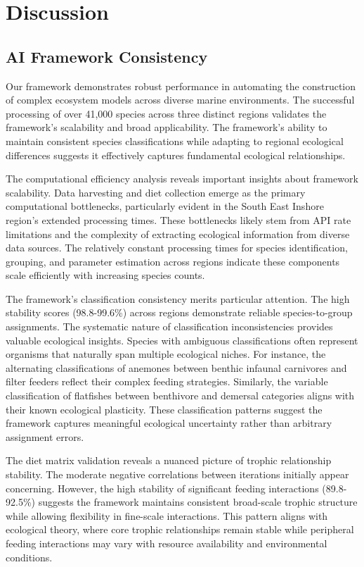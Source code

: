 \section{Discussion}

\subsection{AI Framework Consistency}
Our framework demonstrates robust performance in automating the construction of complex ecosystem models across diverse marine environments. The successful processing of over 41,000 species across three distinct regions validates the framework's scalability and broad applicability. The framework's ability to maintain consistent species classifications while adapting to regional ecological differences suggests it effectively captures fundamental ecological relationships.

The computational efficiency analysis reveals important insights about framework scalability. Data harvesting and diet collection emerge as the primary computational bottlenecks, particularly evident in the South East Inshore region's extended processing times. These bottlenecks likely stem from API rate limitations and the complexity of extracting ecological information from diverse data sources. The relatively constant processing times for species identification, grouping, and parameter estimation across regions indicate these components scale efficiently with increasing species counts.

The framework's classification consistency merits particular attention. The high stability scores (98.8-99.6\%) across regions demonstrate reliable species-to-group assignments. The systematic nature of classification inconsistencies provides valuable ecological insights. Species with ambiguous classifications often represent organisms that naturally span multiple ecological niches. For instance, the alternating classifications of anemones between benthic infaunal carnivores and filter feeders reflect their complex feeding strategies. Similarly, the variable classification of flatfishes between benthivore and demersal categories aligns with their known ecological plasticity. These classification patterns suggest the framework captures meaningful ecological uncertainty rather than arbitrary assignment errors.

The diet matrix validation reveals a nuanced picture of trophic relationship stability. The moderate negative correlations between iterations initially appear concerning. However, the high stability of significant feeding interactions (89.8-92.5\%) suggests the framework maintains consistent broad-scale trophic structure while allowing flexibility in fine-scale interactions. This pattern aligns with ecological theory, where core trophic relationships remain stable while peripheral feeding interactions may vary with resource availability and environmental conditions.

